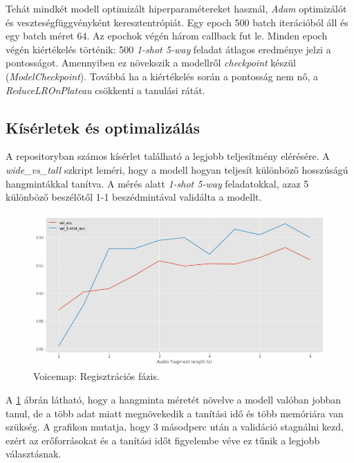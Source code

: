 Tehát mindkét modell optimizált hiperparamétereket használ, \emph{Adam} optimizálót és veszteségfüggvényként keresztentrópiát. Egy epoch $500$ batch iterációból áll és egy batch méret $64$.
Az epochok végén három callback fut le.
\newline
\newline
Minden epoch végén kiértékelés történik: 500 \emph{1-shot 5-way} feladat átlagos eredménye jelzi a pontosságot. Amennyiben ez növekszik a modellről \emph{checkpoint} készül (\emph{ModelCheckpoint}).
Továbbá ha a kiértékelés során a pontosság nem nő, a \emph{ReduceLROnPlateau} csökkenti a tanulási rátát.


\subsection{Kísérletek és optimalizálás}

A repositoryban számos kísérlet található a legjobb teljesítmény elérésére. A \emph{wide\_vs\_tall} szkript leméri, hogy a modell hogyan teljesít különböző hosszúságú hangmintákkal tanítva. A mérés alatt \emph{1-shot 5-way} feladatokkal, azaz 5 különböző beszélőtől 1-1 beszédmintával validálta a modellt.

\begin{figure}[!ht]
	\centering
	\includegraphics[width=150mm, keepaspectratio]{figures/voicemap-wide-vs-tall.png}
	\caption{Voicemap: Regisztrációs fázis.}
	\label{fig:voicemap-wide-vs-tall}
\end{figure}

A \ref{fig:voicemap-wide-vs-tall} ábrán látható, hogy a hangminta méretét növelve a modell valóban jobban tanul, de a több adat miatt megnövekedik a tanítási idő és több memóriára van szükség. A grafikon mutatja, hogy 3 másodperc után a validáció stagnálni kezd, ezért az erőforrásokat és a tanítási időt figyelembe véve ez tűnik a legjobb választásnak.

